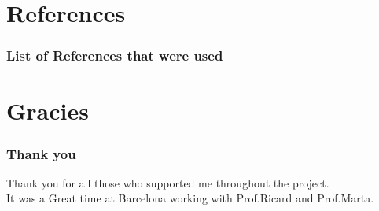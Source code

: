 \documentclass{beamer}
\begin{document}
\section{References}

\frame
{
	\frametitle{List of References that were used}


{}
}
\section{Gracies}

\frame
{
	\frametitle{Thank you}
Thank you for all those who supported me throughout the project.\\
It was a Great time at Barcelona working with Prof.Ricard and Prof.Marta.

{}
}
\end{document}
